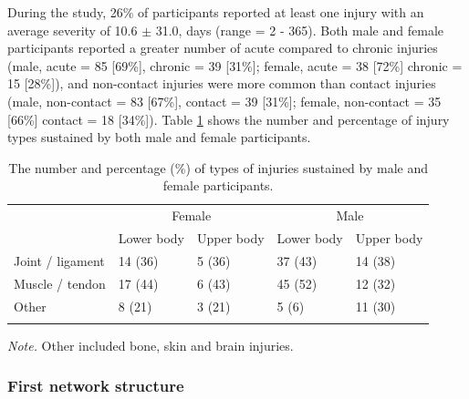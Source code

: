\documentclass[man,floatsintext]{apa6}
\begin{document}
During the study, 26\% of participants reported at least one injury with an average severity of 10.6 \(\pm\) 31.0, days (range = 2 - 365).
Both male and female participants reported a greater number of acute compared to chronic injuries (male, acute = 85 {[}69\%{]}, chronic = 39 {[}31\%{]}; female, acute = 38 {[}72\%{]} chronic = 15 {[}28\%{]}), and non-contact injuries were more common than contact injuries (male, non-contact = 83 {[}67\%{]}, contact = 39 {[}31\%{]}; female, non-contact = 35 {[}66\%{]} contact = 18 {[}34\%{]}).
Table \ref{tab:injurychars} shows the number and percentage of injury types sustained by both male and female participants.

\begin{table}[H]

\begin{center}
\begin{threeparttable}

\caption{\label{tab:injurychars}The number and percentage (\%) of types of injuries sustained by male and female participants.}

\begin{tabular}{lllll}
\toprule
 & \multicolumn{2}{c}{Female} & \multicolumn{2}{c}{Male} \\
\cmidrule(r){2-3} \cmidrule(r){4-5}
 & Lower body & Upper body & Lower body & Upper body\\
\midrule
Joint / ligament & 14 (36) & 5 (36) & 37 (43) & 14 (38)\\
Muscle / tendon & 17 (44) & 6 (43) & 45 (52) & 12 (32)\\
Other & 8 (21) & 3 (21) & 5 (6) & 11 (30)\\
\bottomrule
\addlinespace
\end{tabular}

\begin{tablenotes}[para]
\normalsize{\textit{Note.} Other included bone, skin and brain injuries.}
\end{tablenotes}

\end{threeparttable}
\end{center}

\end{table}

\hypertarget{first-network-structure}{%
\subsubsection{First network structure}\label{first-network-structure}}
\end{document}
